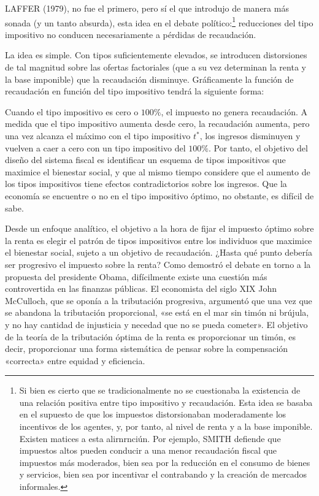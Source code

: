 \documentclass[10pt,a4paper]{article}
\begin{document}
LAFFER (1979), no fue el primero, pero sí el que introdujo de manera más sonada (y un tanto absurda), esta idea en el debate político:\footnote{%
    Si bien es cierto que se tradicionalmente no se cuestionaba la existencia de una relación positiva entre tipo impositivo y recaudación. Esta idea se basaba en el supuesto de que los impuestos distorsionaban moderadamente los incentivos de los agentes, y, por tanto, al nivel de renta y a la base imponible. Existen matices a esta alirnrnciún. Por ejemplo, SMITH defiende que impuestos altos pueden conducir a una menor recaudación fiscal que impuestos más moderados, bien sea por la reducción en el consumo de bienes y servicios, bien sea por incentivar el contrabando y la creación de mercados informales.
} reducciones del tipo impositivo no conducen necesariamente a pérdidas de recaudación. 

La idea es simple. Con tipos suficientemente elevados, se introducen distorsiones de tal magnitud sobre las ofertas factoriales (que a su vez determinan la renta y la base imponible) que la recaudación disminuye. Gráficamente la función de recaudación en función del tipo impositivo tendrá la siguiente forma:



Cuando el tipo impositivo es cero o $100\%$, el impuesto no genera recaudación. A medida que el tipo impositivo aumenta desde cero, la recaudación aumenta, pero una vez alcanza el máximo con el tipo impositivo $t^*$, los ingresos disminuyen y vuelven a caer a cero con un tipo impositivo del $100\%$. Por tanto, el objetivo del diseño del sistema fiscal es identificar un esquema de tipos impositivos que maximice el bienestar social, y que al mismo tiempo considere que el aumento de los tipos impositivos tiene efectos contradictorios sobre los ingresos. Que la economía se encuentre o no en el tipo impositivo óptimo, no obstante, es difícil de sabe. 

Desde un enfoque analítico, el objetivo a la hora de fijar el impuesto óptimo sobre la renta es elegir el patrón de tipos impositivos entre los individuos que maximice el bienestar social, sujeto a un objetivo de recaudación. ¿Hasta qué punto debería ser progresivo el impuesto sobre la renta? Como demostró el debate en torno a la propuesta del presidente Obama, difícilmente existe una cuestión más controvertida en las finanzas públicas. El economista del siglo XIX John McCulloch, que se oponía a la tributación progresiva, argumentó que una vez que se abandona la tributación proporcional, «se está en el mar sin timón ni brújula, y no hay cantidad de injusticia y necedad que no se pueda cometer». El objetivo de la teoría de la tributación óptima de la renta es proporcionar un timón, es decir, proporcionar una forma sistemática de pensar sobre la compensación «correcta» entre equidad y eficiencia.
\end{document}
